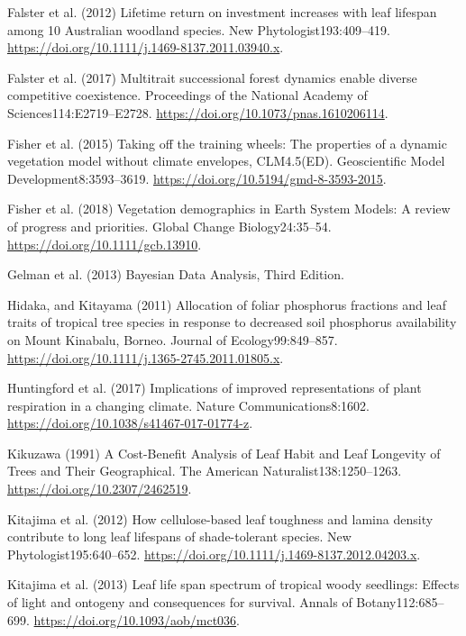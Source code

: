 \documentclass[
  12pt,
  letterpaper,
  DIV=11,
  numbers=noendperiod]{scrartcl}
\newlength{\cslhangindent}
\newenvironment{CSLReferences}[2] %
 {\begin{list}{}{%
  \setlength{\itemindent}{0pt}
  \setlength{\leftmargin}{0pt}
  \setlength{\parsep}{0pt}
  \ifodd #1
   \setlength{\leftmargin}{\cslhangindent}
   \setlength{\itemindent}{-1\cslhangindent}
  \fi
  \setlength{\itemsep}{#2\baselineskip}}}
 {\end{list}}
\begin{document}
\begin{CSLReferences}{1}{1}
Falster et al. (2012) Lifetime return on investment increases with leaf
lifespan among 10 {Australian} woodland species. New
Phytologist193:409--419.
\url{https://doi.org/10.1111/j.1469-8137.2011.03940.x}.

Falster et al. (2017) Multitrait successional forest dynamics enable
diverse competitive coexistence. Proceedings of the National Academy of
Sciences114:E2719--E2728. \url{https://doi.org/10.1073/pnas.1610206114}.

Fisher et al. (2015) Taking off the training wheels: The properties of a
dynamic vegetation model without climate envelopes, {CLM4}.5({ED}).
Geoscientific Model Development8:3593--3619.
\url{https://doi.org/10.5194/gmd-8-3593-2015}.

Fisher et al. (2018) Vegetation demographics in {Earth System Models}:
{A} review of progress and priorities. Global Change Biology24:35--54.
\url{https://doi.org/10.1111/gcb.13910}.

Gelman et al. (2013) Bayesian {Data Analysis}, {Third Edition}.

Hidaka, and Kitayama (2011) Allocation of foliar phosphorus fractions
and leaf traits of tropical tree species in response to decreased soil
phosphorus availability on {Mount Kinabalu}, {Borneo}. Journal of
Ecology99:849--857.
\url{https://doi.org/10.1111/j.1365-2745.2011.01805.x}.

Huntingford et al. (2017) Implications of improved representations of
plant respiration in a changing climate. Nature Communications8:1602.
\url{https://doi.org/10.1038/s41467-017-01774-z}.

Kikuzawa (1991) A {Cost-Benefit Analysis} of {Leaf Habit} and {Leaf
Longevity} of {Trees} and {Their Geographical}. The American
Naturalist138:1250--1263. \url{https://doi.org/10.2307/2462519}.

Kitajima et al. (2012) How cellulose-based leaf toughness and lamina
density contribute to long leaf lifespans of shade-tolerant species. New
Phytologist195:640--652.
\url{https://doi.org/10.1111/j.1469-8137.2012.04203.x}.

Kitajima et al. (2013) Leaf life span spectrum of tropical woody
seedlings: {Effects} of light and ontogeny and consequences for
survival. Annals of Botany112:685--699.
\url{https://doi.org/10.1093/aob/mct036}.


\end{CSLReferences}
\end{document}
